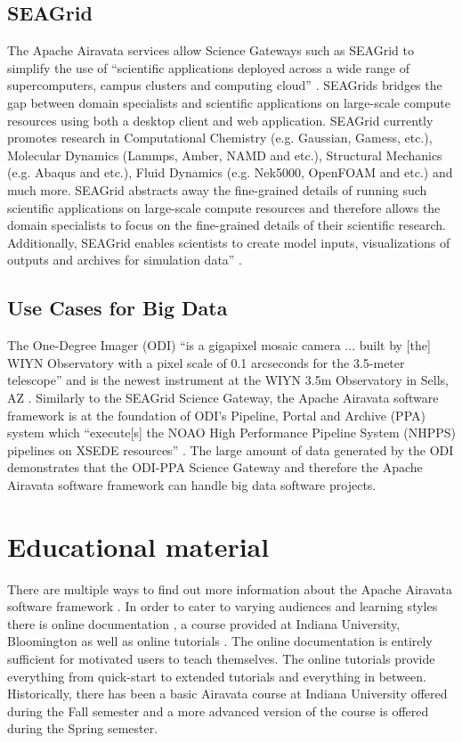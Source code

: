 \documentclass[9pt,twocolumn,twoside]{../../styles/osajnl}
\begin{document}
\subsection{SEAGrid} \label{seagrid}
The Apache Airavata services allow Science Gateways such as SEAGrid to
simplify the use of ``scientific applications deployed across a wide
range of supercomputers, campus clusters and computing cloud''
\cite{www-seagrid}. SEAGrids bridges the gap between domain
specialists and scientific applications on large-scale compute
resources using both a desktop client and web application. SEAGrid
currently promotes research in Computational Chemistry (e.g. Gaussian,
Gamess, etc.), Molecular Dynamics (Lammps, Amber, NAMD and etc.),
Structural Mechanics (e.g. Abaqus and etc.), Fluid Dynamics
(e.g. Nek5000, OpenFOAM and etc.) and much more. SEAGrid abstracts
away the fine-grained details of running such scientific applications
on large-scale compute resources and therefore allows the domain
specialists to focus on the fine-grained details of their scientific
research. Additionally, SEAGrid enables scientists to create model
inputs, visualizations of outputs and archives for simulation data''
\cite{www-seagrid}.

\subsection{Use Cases for Big Data} \label{big}
The One-Degree Imager (ODI) ``is a gigapixel mosaic camera ... built
by [the] WIYN Observatory with a pixel scale of 0.1 arcseconds for the
3.5-meter telescope'' and is the newest instrument at the WIYN 3.5m
Observatory in Sells, AZ \cite{www-odi, www-wiyn}. Similarly to the
SEAGrid Science Gateway, the Apache Airavata software framework is at
the foundation of ODI's Pipeline, Portal and Archive (PPA) system
which ``execute[s] the NOAO High Performance Pipeline System (NHPPS)
pipelines on XSEDE resources'' \cite{www-odi}. The large amount of
data generated by the ODI demonstrates that the ODI-PPA Science
Gateway and therefore the Apache Airavata software framework can
handle big data software projects. 

\section{Educational material} \label{educational}
There are multiple ways to find out more information about the Apache
Airavata software framework \cite{www-airavata}. In order to cater to
varying audiences and learning styles there is online documentation
\cite{www-documentation}, a course provided at Indiana University,
Bloomington \cite{www-class} as well as online tutorials
\cite{www-tutorial}. The online documentation is entirely sufficient
for motivated users to teach themselves. The online tutorials provide
everything from quick-start to extended tutorials and everything in
between. Historically, there has been a basic Airavata course at
Indiana University offered during the Fall semester and a more
advanced version of the course is offered during the Spring semester.
\end{document}
